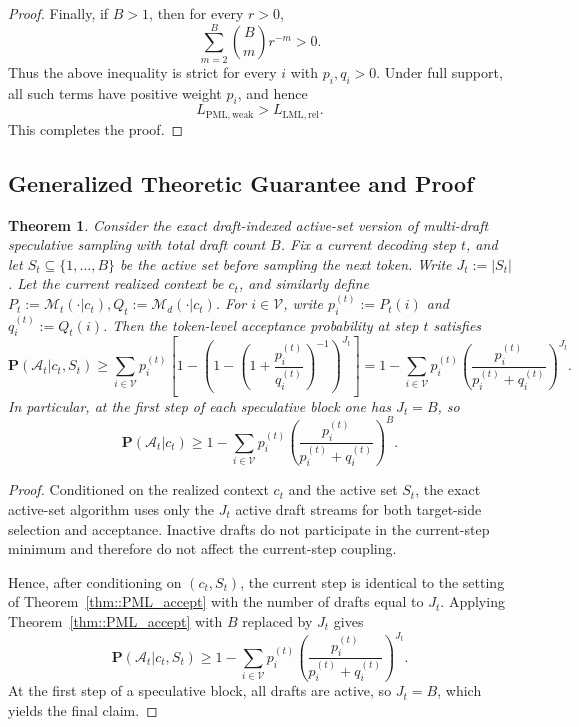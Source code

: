 \documentclass{article}
\theoremstyle{plain}
\newtheorem{theorem}{Theorem}[section]
\theoremstyle{definition}
\begin{document}
\begin{proof}
Finally, if $B>1$, then for every $r>0$,
\[
    \sum_{m=2}^B
    \binom{B}{m}r^{-m}
    >
    0.
\]
Thus the above inequality is strict for every $i$ with $p_i,q_i>0$. Under full
support, all such terms have positive weight $p_i$, and hence
\[
    L_{\mathrm{PML,weak}}
    >
    L_{\mathrm{LML,rel}}.
\]
This completes the proof.
\end{proof}






\subsection{Generalized Theoretic Guarantee and Proof}
\label{subapp::proof_PML_accept_generalized}

\begin{theorem}
\label{thm:accept_bound_pfr_active}
Consider the exact draft-indexed active-set version of multi-draft speculative sampling
with total draft count $B$.
Fix a current decoding step $t$, and let $S_t\subseteq\{1,\ldots,B\}$ be the active set
before sampling the next token. Write $J_t := |S_t|$. 
Let the current realized context be $c_t$, and similarly define $P_t := \mathcal{M}_t(\cdot | c_t), Q_t := \mathcal{M}_d(\cdot | c_t)$. 
For $i\in\mathcal{V}$, write $p_i^{(t)} := P_t(i)$ and $q_i^{(t)} := Q_t(i)$. 
Then the token-level acceptance probability at step $t$ satisfies
\[
\mathbf{P}(\mathcal{A}_t  | c_t,S_t)
\ge
\sum_{i\in\mathcal{V}}
p_i^{(t)}
\left[
1-\left(1-\left(1+\frac{p_i^{(t)}}{q_i^{(t)}}\right)^{-1}\right)^{J_t}
\right]
=
1-\sum_{i\in\mathcal{V}}
p_i^{(t)}
\left(\frac{p_i^{(t)}}{p_i^{(t)}+q_i^{(t)}}\right)^{J_t}.
\]
In particular, at the first step of each speculative block one has $J_t=B$, so
\[
\mathbf{P}(\mathcal{A}_t  | c_t)
\ge
1-\sum_{i\in\mathcal{V}}
p_i^{(t)}
\left(\frac{p_i^{(t)}}{p_i^{(t)}+q_i^{(t)}}\right)^B.
\]
\end{theorem}

\begin{proof}
Conditioned on the realized context $c_t$ and the active set $S_t$, the exact active-set
algorithm uses only the $J_t$ active draft streams for both target-side selection and acceptance.
Inactive drafts do not participate in the current-step minimum and therefore do not affect the
current-step coupling.

Hence, after conditioning on $(c_t,S_t)$, the current step is identical to the setting of
Theorem~\ref{thm::PML_accept} with the number of drafts equal to $J_t$.
Applying Theorem~\ref{thm::PML_accept} with $B$ replaced by $J_t$ gives
\[
\mathbf{P}(\mathcal{A}_t  | c_t,S_t)
\ge
1-\sum_{i\in\mathcal{V}}
p_i^{(t)}
\left(\frac{p_i^{(t)}}{p_i^{(t)}+q_i^{(t)}}\right)^{J_t}.
\]
At the first step of a speculative block, all drafts are active, so $J_t=B$, which yields
the final claim.
\end{proof}
\end{document}
